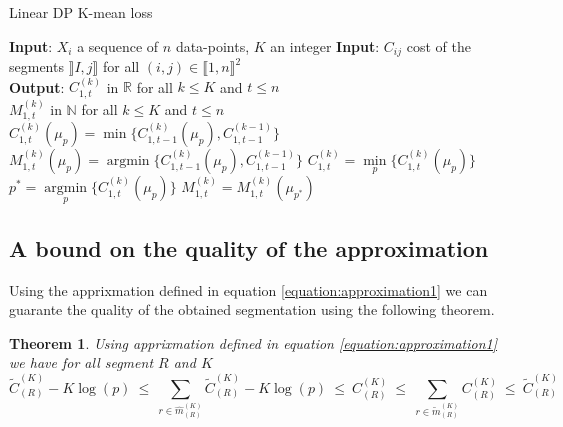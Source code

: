 \documentclass[article,10pt]{llncs}
\newtheorem{theo}{Theorem}[section]    %
\begin{document}
\begin{algorithm}
\begin{algorithmic}
\caption{Linear DP K-mean loss}\label{algo:DPALinear}



    \State \textbf{Input}: $X_i$ a sequence of $n$ data-points, $K$ an integer 
 \State \textbf{Input}: $C_{ij}$ cost of the segments $\rrbracket I, j \rrbracket$  for all $(i, j) \in \llbracket1, n \rrbracket^2$\\
   \State \textbf{Output}: $C^{(k)}_{1,t}$ in $\mathbb{R}$ for all $k \leq K$ and $t \leq n$ \\
    \State $M^{(k)}_{1,t}$ in $\mathbb{N}$ for all $k \leq K$ and $t \leq n$ \\

           \State $C^{(k)}_{1,t}(\mu_p) = \min \{ C^{(k)}_{1,t-1}(\mu_p), C^{(k-1)}_{1,t-1} \}$ 
            \State      $M^{(k)}_{1,t}(\mu_p) = \operatorname{argmin} \{C^{(k)}_{1,t-1}(\mu_p), C^{(k-1)}_{1,t-1} \}$ 
          \EndFor        
           \State $C^{(k)}_{1,t} = \underset{p}{\min} \{ C^{(k)}_{1,t}(\mu_p) \}$ 
	   \State $p^* = \underset{p}{\operatorname{argmin}} \{ C^{(k)}_{1,t}(\mu_p) \}$ 
           \State $M^{(k)}_{1,t} = M^{(k)}_{1,t}( \mu_{{p^*}}) $ 
         \EndFor
    \EndFor
  \end{algorithmic}
\end{algorithm}



\subsection{A bound on the quality of the approximation }
Using the apprixmation defined in equation \ref{equation:approximation1} we can guarante the quality of the obtained segmentation using the following theorem.
\begin{theo}
Using apprixmation defined in equation \ref{equation:approximation1} we have for all segment $R$ and $K$
$$ \widetilde{C}_{(R)}^{(K)} - K \log(p) 
\ \leq \ 
\underset{r \in \widehat{m}_{(R)}^{(K)}}{\operatorname{\sum}} \widetilde{C}_{(R)}^{(K)} - K \log(p) 
\ \leq \ 
{C}_{(R)}^{(K)} 
\ \leq \ 
\underset{r \in \widetilde{m}_{(R)}^{(K)}}{\operatorname{\sum}} {C}_{(R)}^{(K)} 
\ \leq \ 
\widetilde{C}_{(R)}^{(K)} $$
\label{theo:theoapprox}
\end{theo}
\end{document}
